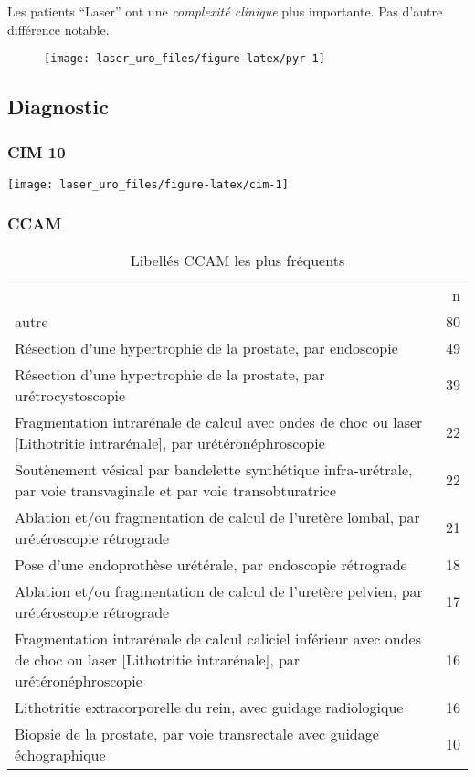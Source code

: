 \documentclass[a4paper,fontsize=10pt,french]{scrartcl}
\begin{document}
Les patients ``Laser'' ont une \emph{complexité clinique} plus
importante. Pas d'autre différence notable.

\begin{figure}
  \texttt{[image: laser\_uro\_files/figure-latex/pyr-1]} 
\end{figure}

\subsection{Diagnostic}\label{diagnostic}

\subsubsection{CIM 10}\label{cim-10}

\texttt{[image: laser\_uro\_files/figure-latex/cim-1]}

\subsubsection{CCAM}\label{ccam}

\begin{table}

\caption{\label{tab:pyr}Libellés CCAM les plus fréquents}
\centering
\begin{tabularx}{\textwidth}[t]{X|r}
  \toprule
 & n\\
autre & 80\\
Résection d'une hypertrophie de la prostate, par endoscopie & 49\\
Résection d'une hypertrophie de la prostate, par urétrocystoscopie & 39\\ 
Fragmentation intrarénale de calcul avec ondes de choc ou laser [Lithotritie intrarénale], par urétéronéphroscopie & 22\\
Soutènement vésical par bandelette synthétique infra-urétrale, par voie transvaginale et par voie transobturatrice & 22\\
Ablation et/ou fragmentation de calcul de l'uretère lombal, par urétéroscopie rétrograde & 21\\
Pose d'une endoprothèse urétérale, par endoscopie rétrograde & 18\\
Ablation et/ou fragmentation de calcul de l'uretère pelvien, par urétéroscopie rétrograde & 17\\
Fragmentation intrarénale de calcul caliciel inférieur avec ondes de choc ou laser [Lithotritie intrarénale], par urétéronéphroscopie & 16\\
Lithotritie extracorporelle du rein, avec guidage radiologique & 16\\
Biopsie de la prostate, par voie transrectale avec guidage échographique & 10\\
  \bottomrule
\end{tabularx}
\end{table}
\end{document}
